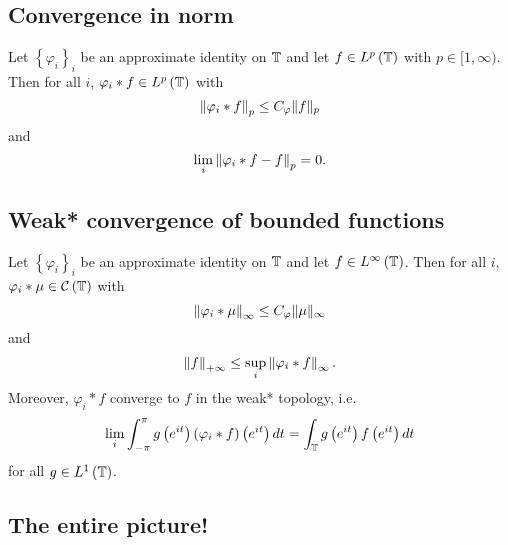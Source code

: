 \subsection{Convergence in norm}
\begin{theorem}
    Let $\left\{ \varphi _{i} \right\}_{i}$ be an approximate identity on $\mathbb T$ and let $f \in L^{p} \left( \mathbb T \right)$ with $p \in [1, \infty)$. Then for all $i$, $\varphi_{i} * f  \in L^{p} \left( \mathbb T \right)$ with
    \begin{equation*}
	\left\lVert \varphi _{i} * f \right\rVert_{p} \le C_{\varphi} \lVert f \rVert _{p}
    \end{equation*}
    and
    \begin{equation*}
	\lim_{i} \left\lVert \varphi_{i} * f -f \right\rVert_{p} = 0 \text{.}
	    \end{equation*} 
    \label{thm:convergence-in-Lp}
\end{theorem}


\subsection{Weak* convergence of bounded functions}
\begin{theorem}
    Let $\left\{ \varphi _{i} \right\}_{i}$ be an approximate identity on $\mathbb T$ and let $f\in L^{\infty} \left( \mathbb T \right)$. Then for all $i$, $\varphi_{i} * \mu  \in {\cal C} \left( \mathbb T \right)$ with
    \begin{equation*}
	\left\lVert \varphi _{i} * \mu \right\rVert_{\infty} \le C_{\varphi} \lVert \mu \rVert _{\infty}
    \end{equation*}
    and
    \begin{equation*}
	\left\lVert f \right\rVert_{+\infty} \le \sup_{i} \left\lVert \varphi_{i} * f \right\rVert_{\infty}\text{.}
    \end{equation*}
    Moreover, $\varphi_{i} * f$ converge to $f$ in the weak* topology, i.e.
    \begin{equation*}
    \lim_{i} \int_{-\pi}^{\pi} g\left( e^{it} \right) \left( \varphi_{i} * f \right) \left( e^{it} \right) dt = \int_{\mathbb T} g\left( e^{it} \right) f \left( e^{it} \right) dt 
    \end{equation*}
    for all $g \in L^{1} \left( \mathbb T \right)$.
    \label{thm:weak-star-infinity}
\end{theorem}

\subsection{The entire picture!}

